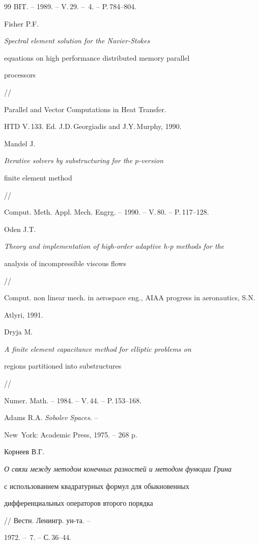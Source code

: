 \begin{thebibliography}{99}
BIT. -- 1989. -- V.\,29. -- \No\,4. -- P.\,784--804.




Fisher P.F.


{\it Spectral element solution for the Navier-Stokes


equations on high performance distributed memory parallel


processors} //


Parallel and Vector Computations in Heat Transfer.


HTD V.\,133. Ed. J.D.\,Georgiadis and J.Y.\,Murphy, 1990.




Mandel J.


{\it Iterative solvers by substructuring for the $p$-version


finite element method} //


Comput. Meth. Appl. Mech. Engrg. -- 1990. -- V.\,80. -- P.\,117--128.




Oden J.T.


{\it Theory and implementation of high-order adaptive h-p methods for the


analysis of incompressible viscous flows} //


Comput. non linear mech. in aerospace eng., AIAA progress in aeronautics, S.N.


Atlyri, 1991.




Dryja M.


{\it A finite element capacitance method for elliptic problems on


regions partitioned into substructures} //


Numer. Math. -- 1984. -- V.\,44. -- P.\,153--168.




Adams R.A. {\em Sobolev Spaces}. --


New~York: Academic Press, 1975. -- 268 p.




Корнеев В.Г.


{\it О связи между методом конечных разностей и методом функции Грина


с использованием квадратурных формул для обыкновенных


дифференциальных операторов второго порядка} // Вестн. Ленингр. ун-та. --


1972. -- \No\,7. -- С.\,36--44.



\end{thebibliography}
